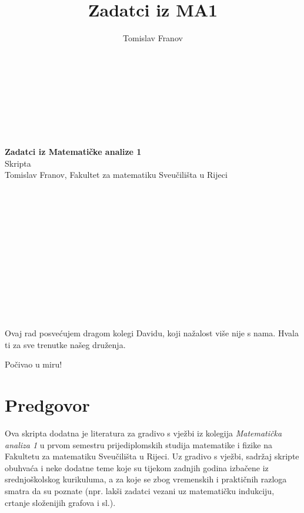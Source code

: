 \documentclass{book}
\title{Zadatci iz MA1}
\author{Tomislav Franov}
\begin{document}
\begin{titlepage}
\begin{center}
\Huge
\textbf{ }\\ \textbf{ }\\ \textbf{ }\\ \textbf{ }\\ \textbf{ }\\ \textbf{ }\\
\textbf{Zadatci iz Matematičke analize 1}\\
\vspace{0.5 cm}
\huge
Skripta \textbf{ }\\
\vspace{0.5 cm}
\Large
Tomislav Franov, Fakultet za matematiku Sveučilišta u Rijeci
\end{center}
\end{titlepage}
\Large
\newpage
\thispagestyle{empty}
\begin{center}
\textbf{ }\\ \textbf{ }\\ \textbf{ }\\ \textbf{ }\\ \textbf{ }\\ \textbf{ }\\
\textbf{ }\\ \textbf{ }\\ \textbf{ }\\ \textbf{ }\\
\textbf{ }\\ \textbf{ }\\
Ovaj rad posvećujem dragom kolegi Davidu, koji nažalost više nije s nama. Hvala ti za sve trenutke našeg druženja.

Počivao u miru!\\
\end{center}
\large
\vspace{0.5 cm}
\tableofcontents
\thispagestyle{empty}
\chapter*{Predgovor}

Ova skripta dodatna je literatura za gradivo s vježbi iz kolegija \textit{Matematička analiza 1} u prvom semestru prijediplomskih studija matematike i fizike na Fakultetu za matematiku Sveučilišta u Rijeci. Uz gradivo s vježbi, sadržaj skripte obuhvaća i neke dodatne teme koje su tijekom zadnjih godina izbačene iz srednjoškolskog kurikuluma, a za koje se zbog vremenskih i praktičnih razloga smatra da su poznate (npr. lakši zadatci vezani uz matematičku indukciju, crtanje složenijih grafova i sl.).
\end{document}
